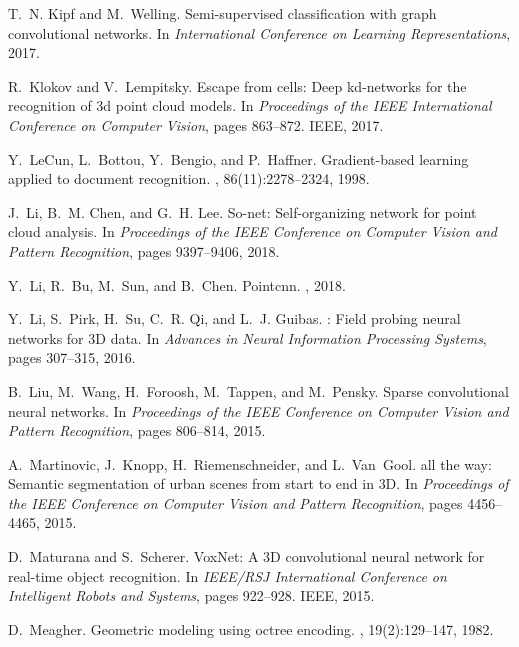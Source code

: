 \documentclass[10pt,twocolumn,letterpaper]{article}
\begin{document}
{\begin{thebibliography}{10}
T.~N. Kipf and M.~Welling.
\newblock Semi-supervised classification with graph convolutional networks.
\newblock In {\em International Conference on Learning Representations}, 2017.

R.~Klokov and V.~Lempitsky.
\newblock Escape from cells: Deep kd-networks for the recognition of 3d point
  cloud models.
\newblock In {\em Proceedings of the IEEE International Conference on Computer
  Vision}, pages 863--872. IEEE, 2017.

Y.~LeCun, L.~Bottou, Y.~Bengio, and P.~Haffner.
\newblock Gradient-based learning applied to document recognition.
, 86(11):2278--2324, 1998.

J.~Li, B.~M. Chen, and G.~H. Lee.
\newblock So-net: Self-organizing network for point cloud analysis.
\newblock In {\em Proceedings of the IEEE Conference on Computer Vision and
  Pattern Recognition}, pages 9397--9406, 2018.

Y.~Li, R.~Bu, M.~Sun, and B.~Chen.
\newblock Pointcnn.
, 2018.

Y.~Li, S.~Pirk, H.~Su, C.~R. Qi, and L.~J. Guibas.
: Field probing neural networks for {3D} data.
\newblock In {\em Advances in Neural Information Processing Systems}, pages
  307--315, 2016.

B.~Liu, M.~Wang, H.~Foroosh, M.~Tappen, and M.~Pensky.
\newblock Sparse convolutional neural networks.
\newblock In {\em Proceedings of the IEEE Conference on Computer Vision and
  Pattern Recognition}, pages 806--814, 2015.

A.~Martinovic, J.~Knopp, H.~Riemenschneider, and L.~Van~Gool.
 all the way: Semantic segmentation of urban scenes from start to
  end in {3D}.
\newblock In {\em Proceedings of the IEEE Conference on Computer Vision and
  Pattern Recognition}, pages 4456--4465, 2015.

D.~Maturana and S.~Scherer.
\newblock Vox{N}et: A {3D} convolutional neural network for real-time object
  recognition.
\newblock In {\em IEEE/RSJ International Conference on Intelligent Robots and
  Systems}, pages 922--928. IEEE, 2015.

D.~Meagher.
\newblock Geometric modeling using octree encoding.
, 19(2):129--147, 1982.


\end{thebibliography}}
\end{document}
